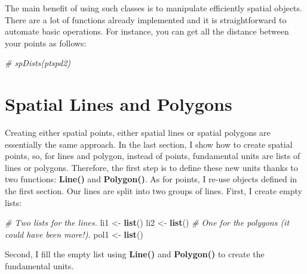 \documentclass[]{report}
\newenvironment{Shaded}{\begin{snugshade}}{\end{snugshade}}
\newcommand{\KeywordTok}[1]{\textcolor[rgb]{0.13,0.29,0.53}{\textbf{{#1}}}}
\newcommand{\StringTok}[1]{\textcolor[rgb]{0.31,0.60,0.02}{{#1}}}
\newcommand{\CommentTok}[1]{\textcolor[rgb]{0.56,0.35,0.01}{\textit{{#1}}}}
\newcommand{\NormalTok}[1]{{#1}}
\begin{document}
The main benefit of using such classes is to manipulate efficiently
spatial objects. There are a lot of functions already implemented and it
is straightforward to automate basic operations. For instance, you can
get all the distance between your points as follows:

\begin{Shaded}
\begin{Highlighting}[]
\CommentTok{# spDists(ptspd2)}
\end{Highlighting}
\end{Shaded}

\section{Spatial Lines and Polygons}\label{spatial-lines-and-polygons}

Creating either spatial points, either spatial lines or spatial polygons
are essentially the same approach. In the last section, I show how to
create spatial points, so, for lines and polygon, instead of points,
fundamental units are lists of lines or polygons. Therefore, the first
step is to define these new units thanks to two functions:
\textbf{Line()} and \textbf{Polygon()}. As for points, I re-use objects
defined in the first section. Our lines are split into two groups of
lines. First, I create empty lists:

\begin{Shaded}
\begin{Highlighting}[]
\CommentTok{# Two lists for the lines.}
\NormalTok{li1 <-}\StringTok{ }\KeywordTok{list}\NormalTok{()}
\NormalTok{li2 <-}\StringTok{ }\KeywordTok{list}\NormalTok{()}
\CommentTok{# One for the polygons (it could have been more!).}
\NormalTok{pol1 <-}\StringTok{ }\KeywordTok{list}\NormalTok{()}
\end{Highlighting}
\end{Shaded}

Second, I fill the empty list using \textbf{Line()} and
\textbf{Polygon()} to create the fundamental units.
\end{document}
